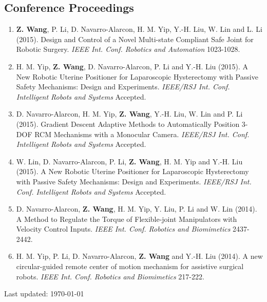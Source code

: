 \documentclass[10pt,letterpaper]{article}
\begin{document}
\subsection*{Conference Proceedings}
\begin{enumerate}
\item \textbf{Z. Wang}, P. Li, D. Navarro-Alarcon, H. M. Yip, Y.-H. Liu, W. Lin and L. Li (2015).
  Design and Control of a Novel Multi-state Compliant Safe Joint for Robotic Surgery.
  \textit{{IEEE} Int. Conf. Robotics and Automation} 1023-1028.
\item H. M. Yip, \textbf{Z. Wang}, D. Navarro-Alarcon, P. Li and Y.-H. Liu (2015).
  A New Robotic Uterine Positioner for Laparoscopic Hysterectomy with Passive Safety Mechanisms: Design and Experiments.
  \textit{{IEEE/RSJ} Int. Conf. Intelligent Robots and Systems} Accepted.
\item D. Navarro-Alarcon, H. M. Yip, \textbf{Z. Wang}, Y.-H. Liu, W. Lin and P. Li (2015).
  Gradient Descent Adaptive Methods to Automatically Position 3-DOF RCM Mechanisms with a Monocular Camera.
  \textit{{IEEE/RSJ} Int. Conf. Intelligent Robots and Systems} Accepted.
\item W. Lin, D. Navarro-Alarcon, P. Li, \textbf{Z. Wang}, H. M. Yip and Y.-H. Liu (2015).
  A New Robotic Uterine Positioner for Laparoscopic Hysterectomy with Passive Safety Mechanisms: Design and Experiments.
  \textit{{IEEE/RSJ} Int. Conf. Intelligent Robots and Systems} Accepted.
\item D. Navarro-Alarcon, \textbf{Z. Wang}, H. M. Yip, Y. Liu, P. Li and W. Lin (2014).
  A Method to Regulate the Torque of Flexible-joint Manipulators with Velocity Control Inputs.
  \textit{{IEEE} Int. Conf. Robotics and Biomimetics} 2437-2442.
\item H. M. Yip, P. Li, D. Navarro-Alarcon, \textbf{Z. Wang} and Y.-H. Liu (2014).
  A new circular-guided remote center of motion mechanism for assistive surgical robots.
  \textit{{IEEE} Int. Conf. Robotics and Biomimetics} 217-222.
\end{enumerate}

\bigskip
{\small Last updated: \today}
\end{document}
